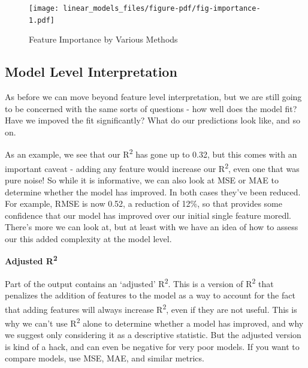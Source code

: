 \documentclass[
  letterpaper,
]{krantz}
\begin{document}
\begin{figure}

{\centering \texttt{[image: linear\_models\_files/figure-pdf/fig-importance-1.pdf]}

}

\caption{\label{fig-importance}Feature Importance by Various Methods}

\end{figure}

\subsection{Model Level Interpretation}\label{sec-lm-model-level}

As before we can move beyond feature level interpretation, but we are
still going to be concerned with the same sorts of questions - how well
does the model fit? Have we impoved the fit significantly? What do our
predictions look like, and so on.

As an example, we see that our R\textsuperscript{2} has gone up to 0.32,
but this comes with an important caveat - adding any feature would
increase our R\textsuperscript{2}, even one that was pure noise! So
while it is informative, we can also look at MSE or MAE to determine
whether the model has improved. In both cases they've been reduced. For
example, RMSE is now 0.52, a reduction of 12\%, so that provides some
confidence that our model has improved over our initial single feature
moredl. There's more we can look at, but at least with we have an idea
of how to assess our this added complexity at the model level.

\begin{tcolorbox}[enhanced jigsaw, toprule=.15mm, colback=white, breakable, rightrule=.15mm, arc=.35mm, bottomrule=.15mm, opacityback=0, colframe=quarto-callout-note-color-frame, leftrule=.75mm, left=2mm]
\begin{minipage}[t]{5.5mm}
\textcolor{quarto-callout-note-color}{\faInfo}
\end{minipage}%
\begin{minipage}[t]{\textwidth - 5.5mm}

\textbf{Adjusted R\textsuperscript{2}}\vspace{2mm}

Part of the output contains an `adjusted' R\textsuperscript{2}. This is
a version of R\textsuperscript{2} that penalizes the addition of
features to the model as a way to account for the fact that adding
features will always increase R\textsuperscript{2}, even if they are not
useful. This is why we can't use R\textsuperscript{2} alone to determine
whether a model has improved, and why we suggest only considering it as
a descriptive statistic. But the adjusted version is kind of a hack, and
can even be negative for very poor models. If you want to compare
models, use MSE, MAE, and similar metrics.

\end{minipage}%
\end{tcolorbox}
\end{document}
